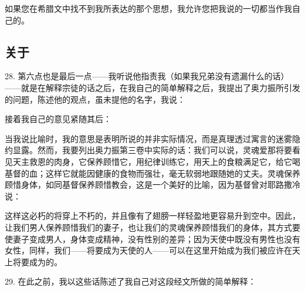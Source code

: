 \par

如果您在希腊文中找不到我所表达的那个思想，我允许您把我说的一切都当作我自己的。\par


\subsection{关于}

28. 第六点也是最后一点——我听说他指责我（如果我兄弟没有遗漏什么的话）——就是在解释宗徒的话之后，在我自己的简单解释之后，我提出了奥力振所引发的问题，陈述他的观点，虽未提他的名字，我说：\par

接着我自己的意见紧随其后：\par

当我说比喻时，我的意思是表明所说的并非实际情况，而是真理透过寓言的迷雾隐约显露。然而，我要列出奥力振第三卷中实际的话：我们可以说，灵魂爱那将要看见天主救恩的肉身，它保养顾惜它，用纪律训练它，用天上的食粮满足它，给它喝基督的血；这样它就能因健康的食物而强壮，毫无软弱地跟随她的丈夫。灵魂保养顾惜身体，如同基督保养顾惜教会，这是一个美好的比喻，因为基督曾对耶路撒冷说：\par

这样这必朽的将穿上不朽的，并且像有了翅膀一样轻盈地更容易升到空中。因此，让我们男人保养顾惜我们的妻子，也让我们的灵魂保养顾惜我们的身体，其方式要使妻子变成男人，身体变成精神，没有性别的差异；因为天使中既没有男性也没有女性，同样，我们——将要成为天使的人——可以在这里开始成为我们被应许在天上将要成为的。\par

29. 在此之前，我以这些话陈述了我自己对这段经文所做的简单解释：\par

\par

